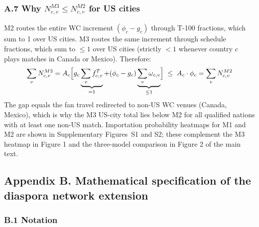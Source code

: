 \documentclass[12pt, a4paper]{article}
\begin{document}
\subsubsection*{A.7 Why $N_{c,v}^{M3} \leq N_{c,v}^{M2}$ for
US cities}

M2 routes the entire WC increment $(\phi_c - g_c)$ through T-100
fractions, which sum to 1 over US cities. M3 routes the same
increment through schedule fractions, which sum to $\leq 1$ over
US cities (strictly $<1$ whenever country $c$ plays matches in
Canada or Mexico). Therefore:
\[
  \sum_{v} N_{c,v}^{M3}
    = A_c \Bigl[
        g_c \underbrace{\sum_v f_{c,v}^T}_{=1}
        + (\phi_c - g_c)
          \underbrace{\sum_v \omega_{c,v}}_{\leq 1}
      \Bigr]
  \;\leq\;
  A_c \cdot \phi_c
    = \sum_v N_{c,v}^{M2}
\]
The gap equals the fan travel redirected to non-US WC venues
(Canada, Mexico), which is why the M3 US-city total lies below
M2 for all qualified nations with at least one non-US match.
Importation probability heatmaps for M1 and M2 are shown in
Supplementary Figures~S1 and S2; these complement the M3 heatmap
in Figure 1 and the three-model comparison in
Figure 2 of the main text.

\newpage

\subsection*{Appendix B. Mathematical specification of the diaspora
network extension}

\subsubsection*{B.1 Notation}
\end{document}
